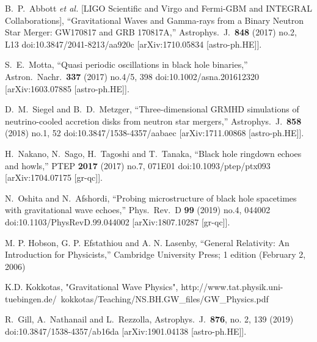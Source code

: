 \documentclass[12pt]{article}
\begin{document}
\begin{thebibliography}{99}
  B.~P.~Abbott {\it et al.} [LIGO Scientific and Virgo and Fermi-GBM and INTEGRAL Collaborations],
  ``Gravitational Waves and Gamma-rays from a Binary Neutron Star Merger: GW170817 and GRB 170817A,''
  Astrophys.\ J.\  {\bf 848} (2017) no.2,  L13
  doi:10.3847/2041-8213/aa920c
  [arXiv:1710.05834 [astro-ph.HE]].

  S.~E.~Motta,
  ``Quasi periodic oscillations in black hole binaries,''
  Astron.\ Nachr.\  {\bf 337} (2017) no.4/5,  398
  doi:10.1002/asna.201612320
  [arXiv:1603.07885 [astro-ph.HE]].

  D.~M.~Siegel and B.~D.~Metzger,
  ``Three-dimensional GRMHD simulations of neutrino-cooled accretion disks from neutron star mergers,''
  Astrophys.\ J.\  {\bf 858} (2018) no.1,  52
  doi:10.3847/1538-4357/aabaec
  [arXiv:1711.00868 [astro-ph.HE]].

  H.~Nakano, N.~Sago, H.~Tagoshi and T.~Tanaka,
  ``Black hole ringdown echoes and howls,''
  PTEP {\bf 2017} (2017) no.7,  071E01
  doi:10.1093/ptep/ptx093
  [arXiv:1704.07175 [gr-qc]].
  
  N.~Oshita and N.~Afshordi,
  ``Probing microstructure of black hole spacetimes with gravitational wave echoes,''
  Phys.\ Rev.\ D {\bf 99} (2019) no.4,  044002
  doi:10.1103/PhysRevD.99.044002
  [arXiv:1807.10287 [gr-qc]].

  M. P. Hobson, G. P. Efstathiou and A. N. Lasenby,
  ``General Relativity: An Introduction for Physicists,''
  Cambridge University Press; 1 edition (February 2, 2006)

  K.D. Kokkotas,
  "Gravitational Wave Physics",
  {http://www.tat.physik.uni-tuebingen.de/~kokkotas/Teaching/NS.BH.GW\_files/GW\_Physics.pdf}

  R.~Gill, A.~Nathanail and L.~Rezzolla,
  Astrophys.\ J.\  {\bf 876}, no. 2, 139 (2019)
  doi:10.3847/1538-4357/ab16da
  [arXiv:1901.04138 [astro-ph.HE]].
\end{thebibliography}
\end{document}
